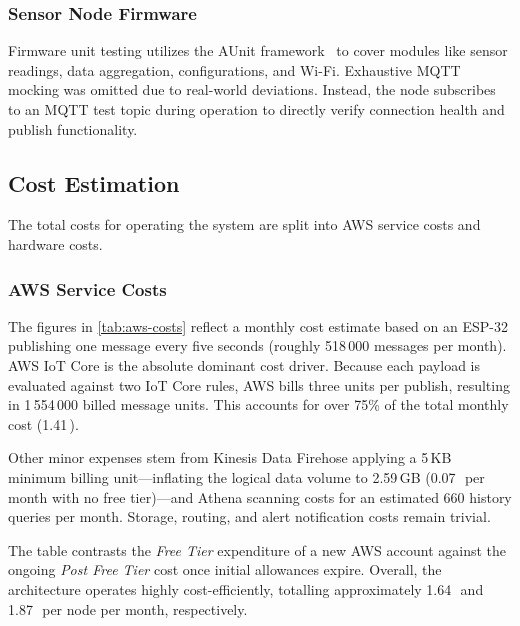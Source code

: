 \subsubsection{Sensor Node Firmware}
Firmware unit testing utilizes the AUnit framework~\cite{aunit_testing_arduino} to cover
modules like sensor readings, data aggregation, configurations, and Wi-Fi. Exhaustive
MQTT mocking was omitted due to real-world deviations. Instead, the node
subscribes to an MQTT test topic during operation to directly verify connection
health and publish functionality.

\subsection{Cost Estimation}\label{sec:cost_estimation}

The total costs for operating the system are split into AWS service costs and hardware costs.

\subsubsection{AWS Service Costs}
The figures in \cref{tab:aws-costs} reflect a monthly cost estimate
based on an ESP-32 publishing one message every five seconds (roughly
518\,000 messages per month). AWS IoT Core is the absolute dominant cost driver.
Because each payload is evaluated against two IoT Core rules, AWS bills
three units per publish, resulting in 1\,554\,000 billed message units.
This accounts for over 75\% of the total monthly cost (1.41\,\texteuro).

Other minor expenses stem from Kinesis Data Firehose applying a 5\,KB minimum
billing unit---inflating the logical data volume to 2.59\,GB (0.07\,\texteuro~per month
with no free tier)---and Athena scanning costs for an estimated 660 history queries
per month. Storage, routing, and alert notification costs remain trivial.

The table contrasts the \emph{Free Tier} expenditure of a new AWS account
against the ongoing \emph{Post Free Tier} cost once initial allowances expire.
Overall, the architecture operates highly cost-efficiently, totalling approximately
1.64\,\texteuro~and 1.87\,\texteuro~per node per month, respectively.

